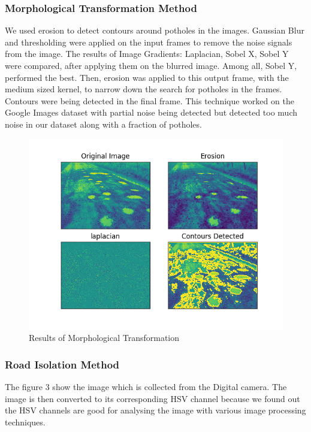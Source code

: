 \documentclass[journal]{IEEEtran}
\begin{document}
\subsubsection{Morphological Transformation Method}
We used erosion to detect contours around potholes in the images. Gaussian Blur and thresholding were applied on the input frames to remove the noise signals from the image. The results of Image Gradients: Laplacian, Sobel X, Sobel Y were compared, after applying them on the blurred image. Among all, Sobel Y, performed the best. Then, erosion was applied to this output frame, with the medium sized kernel, to narrow down the search for potholes in the frames. Contours were being detected in the final frame. This technique worked on the Google Images dataset with partial noise being detected but detected too much noise in our dataset along with a fraction of potholes.

\begin{figure}[!htb]
\begin{center}
\includegraphics[scale=0.65]{Images/morph_transform_2.png}
\end{center}
\caption{Results of Morphological Transformation}
\end{figure}

\newpage

\subsubsection{Road Isolation Method}

\noindent The figure 3 show the image which is collected from the Digital camera. The image is then converted to its corresponding HSV channel because we found out the HSV channels are good for analysing the image with various image processing techniques. 
\end{document}
